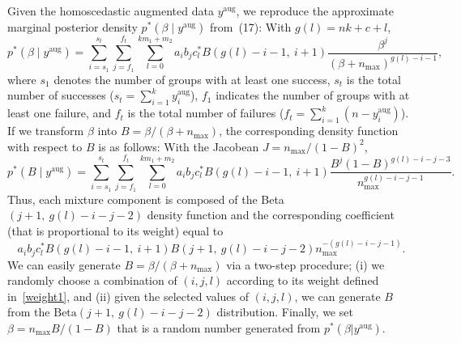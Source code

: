 \documentclass[12pt]{article}
\begin{document}
\begin{appendix}
Given the homoscedastic augmented data $y^{\textrm{aug}}$, we  reproduce the approximate marginal posterior density $p^\ast(\beta\mid y^{\textrm{aug}})$ from~(17): With $g(l)=nk+c+l$, 
$$
p^\ast(\beta\mid y^{\textrm{aug}})=\sum_{i=s_1}^{s_t}\sum_{j=f_1}^{f_t} \sum_{l=0}^{km_1+m_2}a_ib_jc^\ast_lB(g(l)-i-1,~ i+1)\frac{\beta^j}{(\beta+n_{\textrm{max}})^{g(l)-i-1}},
$$
where $s_1$ denotes the number of groups with at least one success, $s_t$ is the total number of successes ($s_t=\sum_{i=1}^ky_i^{\textrm{aug}}$), $f_1$ indicates the number of groups with at least one failure, and $f_t$ is the total number of failures ($f_t=\sum_{i=1}^k (n-y_i^{\textrm{aug}})$). If we transform $\beta$ into $B=\beta/(\beta+n_{\textrm{max}})$, the corresponding density function with respect to $B$ is as follows: With the Jacobean $ J =n_{\textrm{max}}/(1-B)^2$,
$$
p^\ast(B\mid y^{\textrm{aug}})=\sum_{i=s_1}^{s_t}\sum_{j=f_1}^{f_t} \sum_{l=0}^{km_1+m_2}a_ib_jc^\ast_lB(g(l)-i-1,~ i+1)\frac{B^j(1-B)^{g(l)-i-j-3}}{n^{g(l)-i-j-1}_{\textrm{max}}}.
$$
Thus, each mixture component is composed of the Beta$(j+1,~ g(l)-i-j-2)$ density function  and the corresponding coefficient (that is proportional to its weight) equal to 
\begin{equation}\label{weight1}
a_ib_jc^\ast_lB(g(l)-i-1,~ i+1)B(j+1,~ g(l)-i-j-2)n^{-(g(l)-i-j-1)}_{\textrm{max}}.
\end{equation}
We can easily generate $B=\beta/(\beta+n_{\textrm{max}})$ via a two-step procedure; (i) we randomly choose a combination of $(i, j, l)$ according to its weight defined in~\eqref{weight1}, and (ii) given the selected values of $(i, j, l)$, we can generate $B$ from the $\textrm{Beta}(j+1,~ g(l)-i-j-2)$ distribution. Finally, we set $\beta=n_{\textrm{max}}B/(1-B)$ that is a random number generated from $p^\ast(\beta\vert y^{\textrm{aug}})$.



\end{appendix}
\end{document}
